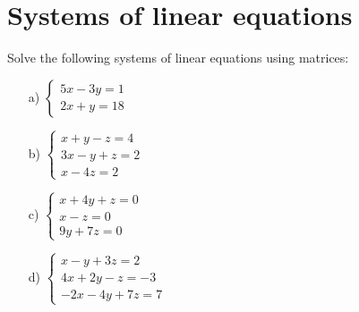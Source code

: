 
\section{Systems of linear equations}
\begin{problem}%
    Solve the following systems of linear equations using matrices:

    \begin{enumerate}
        \item[a) ] $\begin{cases}
            5x-3y=1\\
            2x+y=18
        \end{cases}$
        
        \item[b) ] $\begin{cases}
            x+y-z=4\\
            3x-y+z=2\\
            x-4z=2
        \end{cases}$
        
        \item[c) ] $\begin{cases}
            x+4y+z=0\\
            x-z=0\\
            9y+7z=0
        \end{cases}$
        
        \item[d) ] $\begin{cases}
            x-y+3z=2\\
            4x+2y-z=-3\\
            -2x-4y+7z=7
        \end{cases}$
        
    \end{enumerate}
\end{problem}



